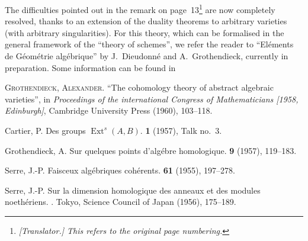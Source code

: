 \documentclass{article}
\theoremstyle{plain}
\theoremstyle{definition}
\DeclareMathOperator{\Ext}{Ext}
\begin{document}
The difficulties pointed out in the remark on page~13\footnote{\emph{[Translator.] This refers to the original page numbering.}} are now completely resolved, thanks to an extension of the duality theorems to arbitrary varieties (with arbitrary singularities).
For this theory, which can be formalised in the general framework of the ``theory of schemes'', we refer the reader to ``El\'{e}ments de G\'{e}om\'{e}trie alg\'{e}brique'' by J.~Dieudonn\'{e} and A.~Grothendieck, currently in preparation.
Some information can be found in

\begin{center}
  \textsc{Grothendieck, Alexander.} ``The cohomology theory of abstract algebraic varieties'', in \emph{Proceedings of the international Congress of Mathematicians [1958, Edinburgh]}, Cambridge University Press (1960), 103--118.
\end{center}

\noindent[April, 1959]



\nocite{*}
% 
\begin{thebibliography}{4}

  {\sc Cartier, P.}
  \newblock Des groups $\Ext^s(A,B)$.
   \textbf{1} (1957), Talk no.~3.

  {\sc Grothendieck, A.}
  \newblock Sur quelques points d'alg\'{e}bre homologique.
   {\bf 9} (1957), 119--183.

  {\sc Serre, J.-P.}
  \newblock Faisceux alg\'{e}briques coh\'{e}rents.
   {\bf 61} (1955), 197--278.

  {\sc Serre, J.-P.}
  \newblock Sur la dimension homologique des anneaux et des modules noeth\'{e}riens.
  .
  \newblock Tokyo, Science Council of Japan (1956), 175--189.

\end{thebibliography}
\end{document}
